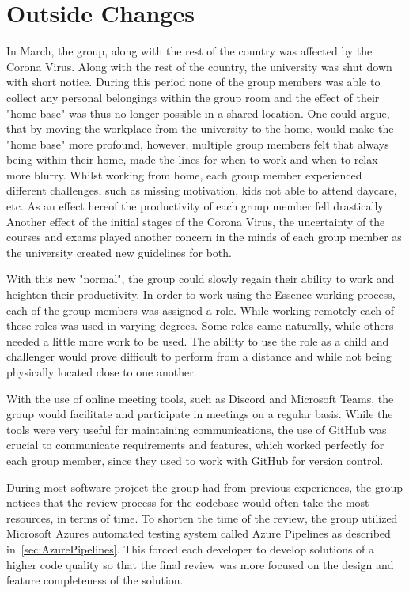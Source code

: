 \section{Outside Changes}
In March, the group, along with the rest of the country was affected by the Corona Virus.
Along with the rest of the country, the university was shut down with short notice.
During this period none of the group members was able to collect any personal belongings within the group room and the effect of their "home base" was thus no longer possible in a shared location.
One could argue, that by moving the workplace from the university to the home, would make the "home base" more profound, however, multiple group members felt that always being within their home, made the lines for when to work and when to relax more blurry.
Whilst working from home, each group member experienced different challenges, such as missing motivation, kids not able to attend daycare, etc.
As an effect hereof the productivity of each group member fell drastically.
Another effect of the initial stages of the Corona Virus, the uncertainty of the courses and exams played another concern in the minds of each group member as the university created new guidelines for both.

With this new "normal", the group could slowly regain their ability to work and heighten their productivity.
In order to work using the Essence working process, each of the group members was assigned a role.
While working remotely each of these roles was used in varying degrees.
Some roles came naturally, while others needed a little more work to be used.
The ability to use the role as a child and challenger would prove difficult to perform from a distance and while not being physically located close to one another. 

With the use of online meeting tools, such as Discord and Microsoft Teams, the group would facilitate and participate in meetings on a regular basis.
While the tools were very useful for maintaining communications, the use of GitHub was crucial to communicate requirements and features, which worked perfectly for each group member, since they used to work with GitHub for version control.

During most software project the group had from previous experiences, the group notices that the review process for the codebase would often take the most resources, in terms of time.
To shorten the time of the review, the group utilized Microsoft Azures automated testing system called Azure Pipelines as described in~\autoref{sec:AzurePipelines}.
This forced each developer to develop solutions of a higher code quality so that the final review was more focused on the design and feature completeness of the solution.
